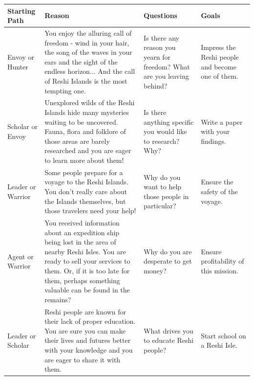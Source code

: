 
\onecolumn

\begin{table}
\centering
\label{backstoryIdeas}

\begin{tabular}{p{2.8cm} p{6cm} p{3cm} p{3cm}}
	\hline
	\color{black} Starting Path & \color{black} Reason & \color{black} Questions & \color{black} Goals \newline \\ \hline
	
	\color{black} Envoy or Hunter
	&
	\color{black} You enjoy the alluring call of freedom - wind in your hair, the song of the waves in your ears and the sight of the endless horizon... And the call of Reshi Islands is the most tempting one. \newline
	&
	\color{black} Is there any reason you yearn for freedom? What are you leaving behind?
	&
	\color{black} Impress the Reshi people and become one of them.
	\\ \hline
	
	\color{black} Scholar or Envoy
	&
	\color{black} Unexplored wilds of the Reshi Islands hide many mysteries waiting to be uncovered. Fauna, flora and folklore of those areas are barely researched and you are eager to learn more about them! \newline
	&
	\color{black} Is there anything specific you would like to research? Why?
	&
	\color{black} Write a paper with your findings.
	\\ \hline
	
	\color{black} Leader or Warrior
	&
	\color{black} Some people prepare for a voyage to the Reshi Islands. You don't really care about the Islands themselves, but those travelers need your help! \newline
	&
	\color{black} Why do you want to help those people in particular?
	&
	\color{black} Ensure the safety of the voyage.
	\\ \hline
	
	\color{black} Agent or Warrior
	&
	\color{black} You received information about an expedition ship being lost in the area of nearby Reshi Isles. You are ready to sell your services to them. Or, if it is too late for them, perhaps something valuable can be found in the remains? \newline
	&
	\color{black} Why do you are desperate to get money?
	&
	\color{black} Ensure profitability of this mission.
	\\ \hline
	
	\color{black} Leader or Scholar
	&
	\color{black} Reshi people are known for their lack of proper education. You are sure you can make their lives and futures better with your knowledge and you are eager to share it with them. \newline
	&
	\color{black} What drives you to educate Reshi people?
	&
	\color{black} Start school on a Reshi Isle.
	\\ \hline
	

\end{tabular}
\end{table}
